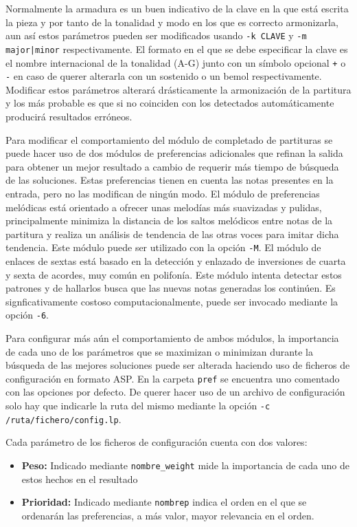 Normalmente la armadura es un buen indicativo de la clave en la que está escrita la pieza y por tanto de la tonalidad y modo en los que es correcto armonizarla, aun así estos parámetros pueden ser modificados usando \texttt{-k CLAVE} y \texttt{-m major|minor} respectivamente. 
El formato en el que se debe especificar la clave es el nombre internacional de la tonalidad (A-G) junto con un símbolo opcional \texttt{+} o \texttt{-} en caso de querer alterarla con un sostenido o un bemol respectivamente. Modificar estos parámetros alterará drásticamente la armonización de la partitura y los más probable es que si no coinciden con los detectados automáticamente producirá resultados erróneos.

Para modificar el comportamiento del módulo de completado de partituras se puede hacer uso de dos módulos de preferencias adicionales que refinan la salida para obtener un mejor resultado a cambio de requerir más tiempo de búsqueda de las soluciones. Estas preferencias tienen en cuenta las notas presentes en la entrada, pero no las modifican de ningún modo. 
El módulo de preferencias melódicas está orientado a ofrecer unas melodías más suavizadas y pulidas, principalmente minimiza la distancia de los saltos melódicos entre notas de la partitura y realiza un análisis de tendencia de las otras voces para imitar dicha tendencia. Este módulo puede ser utilizado con la opción \texttt{-M}.
El módulo de enlaces de sextas está basado en la detección y enlazado de inversiones de cuarta y sexta de acordes, muy común en polifonía. Este módulo intenta detectar estos patrones y de hallarlos busca que las nuevas notas generadas los continúen. Es signficativamente costoso computacionalmente, puede ser invocado mediante la opción \texttt{-6}.

Para configurar más aún el comportamiento de ambos módulos, la importancia de cada uno de los parámetros que se maximizan o minimizan durante la búsqueda de las mejores soluciones puede ser alterada haciendo uso de ficheros de configuración en formato ASP. En la carpeta \texttt{pref} se encuentra uno comentado con las opciones por defecto. De querer hacer uso de un archivo de configuración solo hay que indicarle la ruta del mismo mediante la opción \texttt{-c /ruta/fichero/config.lp}. 

Cada parámetro de los ficheros de configuración cuenta con dos valores:
\begin{itemize}
	\item \textbf{Peso:} Indicado mediante \texttt{nombre\_weight} mide la importancia de cada uno de estos hechos en el resultado
	\item \textbf{Prioridad:} Indicado mediante \texttt{nombrep} indica el orden en el que se ordenarán las preferencias, a más valor, mayor relevancia en el orden.
\end{itemize}

